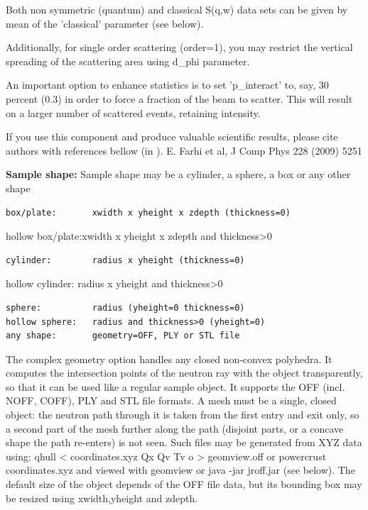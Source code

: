 Both non symmetric (quantum) and classical S(q,w) data sets can be given by mean of the 'classical' parameter (see below).

Additionally, for single order scattering (order=1), you may restrict the vertical spreading of the scattering area using d\_phi parameter.

An important option to enhance statistics is to set 'p\_interact' to, say, 30 percent (0.3) in order to force a fraction of the beam to scatter. This will result on a larger number of scattered events, retaining intensity.

If you use this component and produce valuable scientific results, please cite authors with references bellow (in ). E. Farhi et al, J Comp Phys 228 (2009) 5251

\textbf{Sample shape:} Sample shape may be a cylinder, a sphere, a box or any other shape

\begin{verbatim}
box/plate:       xwidth x yheight x zdepth (thickness=0)
\end{verbatim}

hollow box/plate:xwidth x yheight x zdepth and thickness\textgreater{}0

\begin{verbatim}
cylinder:        radius x yheight (thickness=0)
\end{verbatim}

hollow cylinder: radius x yheight and thickness\textgreater{}0

\begin{verbatim}
sphere:          radius (yheight=0 thickness=0)
hollow sphere:   radius and thickness>0 (yheight=0)
any shape:       geometry=OFF, PLY or STL file
\end{verbatim}

The complex geometry option handles any closed non-convex polyhedra. It computes the intersection points of the neutron ray with the object transparently, so that it can be used like a regular sample object. It supports the OFF (incl. NOFF, COFF), PLY and STL file formats. A mesh must be a single, closed object: the neutron path through it is taken from the first entry and exit only, so a second part of the mesh further along the path (disjoint parts, or a concave shape the path re-enters) is not seen. Such files may be generated from XYZ data using: qhull \textless{} coordinates.xyz Qx Qv Tv o \textgreater{} geomview.off or powercrust coordinates.xyz and viewed with geomview or java -jar jroff.jar (see below). The default size of the object depends of the OFF file data, but its bounding box may be resized using xwidth,yheight and zdepth.

